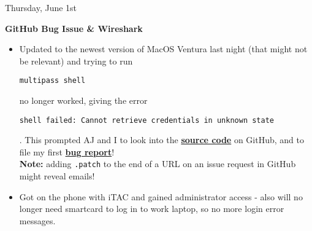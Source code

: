\documentclass[11pt]{article}
\newcommand\codebox[1]{
    \noindent\hspace{-0.25em}\begin{tcolorbox}[on line, hbox, colback = codeblack, colframe = codeborder, coltext = white, boxrule = 1.5pt, left = 2pt, right = 2pt, top = 0.5pt, bottom = 0.5pt]
    \small\texttt{#1}\normalsize
    \end{tcolorbox}
}
\begin{document}
\begin{bloodorangebox}{Thursday, June 1st\vspace{-2em}\begin{flushright}\large\textbf{GitHub Bug Issue \& Wireshark}\end{flushright}}
\begin{itemize}
\begin{itemize}
        \small{\textbf{Note:} early iTunes let you pirate songs by streaming from another person's device, using things of a similar fashion. Why does Apple having Airplay listening ports on by default?}
        \item Port \codebox{*.53} is DNS, according to \href{https://support.apple.com/en-ca/HT202944}{\textbf{this}} list of what ports usually listen to on MacOS.
    \end{itemize}
    \item Updated to the newest version of MacOS Ventura last night (that might not be relevant) and trying to run \codebox{multipass shell} no longer worked, giving the error \codebox{shell failed: Cannot retrieve credentials in unknown state}. This prompted AJ and I to look into the \href{https://github.com/canonical/multipass}{\textbf{source code}} on GitHub, and to file my first \href{https://github.com/canonical/multipass/issues/3106}{\textbf{bug report}}!\\
    \small{\textbf{Note:} adding \texttt{.patch} to the end of a URL on an issue request in GitHub might reveal emails!}
    \item\normalsize{Got on the phone with iTAC and gained administrator access - also will no longer need smartcard to log in to work laptop, so no more login error messages.}
\end{itemize}
\end{bloodorangebox}
\end{document}
